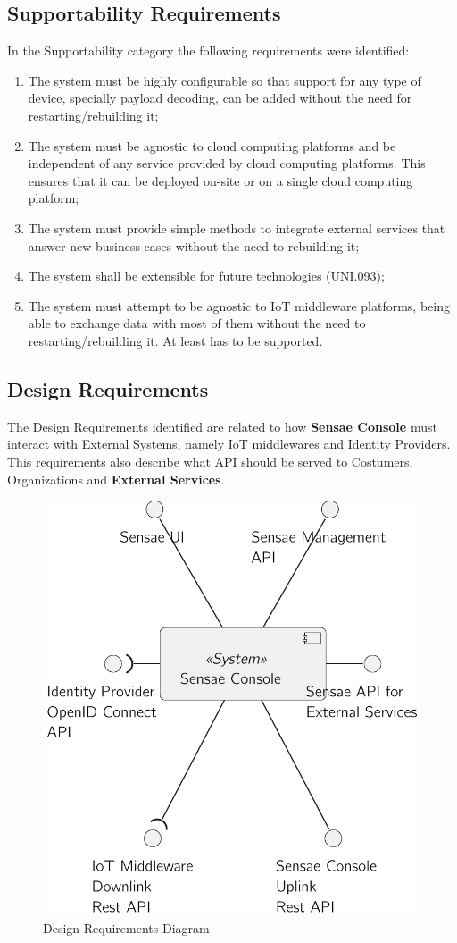 \subsection{Supportability Requirements}
\label{subsec:requirements:non_functional:supportability}

In the Supportability category the following requirements were identified:

\begin{enumerate}
    \item The system must be highly configurable so that support for any type of device, specially payload decoding, can be added without the need for restarting/rebuilding it;
    \item The system must be agnostic to cloud computing platforms and be independent of any service provided by cloud computing platforms. This ensures that it can be deployed on-site or on a single cloud computing platform;
    \item The system must provide simple methods to integrate external services that answer new business cases without the need to rebuilding it;
    \item The system shall be extensible for future technologies (UNI.093);
    \item The system must attempt to be agnostic to \gls{IoT} middleware platforms, being able to exchange data with most of them without the need to restarting/rebuilding it. At least  has to be supported.
\end{enumerate}

\subsection{Design Requirements}
\label{subsec:requirements:non_functional:design}

The Design Requirements identified are related to how \textbf{Sensae Console} must interact with External Systems, namely \gls{IoT} middlewares and Identity Providers. This requirements also describe what \gls{API} should be served to Costumers, Organizations and \textbf{External Services}.

\begin{figure}[H]
    \centering
    \includegraphics[page=1,width=0.5\columnwidth]{assets/diagrams/design/architectural/level1/logical-view-v2.pdf}
    \caption[Design Requirements Diagram]{Design Requirements Diagram}
    \label{fig:requirements:non_functional:design}
\end{figure}


